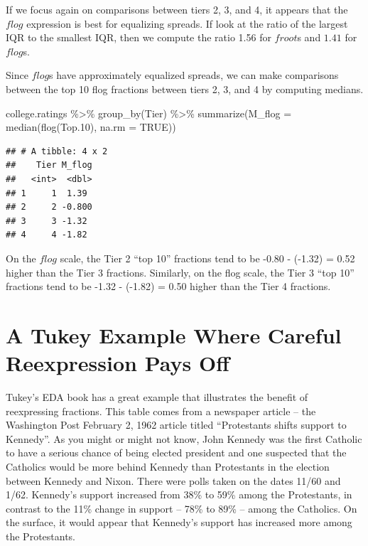 \documentclass[
]{book}
\newenvironment{Shaded}{\begin{snugshade}}{\end{snugshade}}
\newcommand{\AttributeTok}[1]{\textcolor[rgb]{0.77,0.63,0.00}{#1}}
\newcommand{\ConstantTok}[1]{\textcolor[rgb]{0.00,0.00,0.00}{#1}}
\newcommand{\FloatTok}[1]{\textcolor[rgb]{0.00,0.00,0.81}{#1}}
\newcommand{\FunctionTok}[1]{\textcolor[rgb]{0.00,0.00,0.00}{#1}}
\newcommand{\NormalTok}[1]{#1}
\newcommand{\SpecialCharTok}[1]{\textcolor[rgb]{0.00,0.00,0.00}{#1}}
\begin{document}
If we focus again on comparisons between tiers 2, 3, and 4, it appears that the \(flog\) expression is best for equalizing spreads. If look at the ratio of the largest IQR to the smallest IQR, then we compute the ratio 1.56 for \(froot\)s and \(1.41\) for \(flog\)s.

Since \(flog\)s have approximately equalized spreads, we can make comparisons between the top 10 flog fractions between tiers 2, 3, and 4 by computing medians.

\begin{Shaded}
\begin{Highlighting}[]
\NormalTok{college.ratings }\SpecialCharTok{\%\textgreater{}\%} 
  \FunctionTok{group\_by}\NormalTok{(Tier) }\SpecialCharTok{\%\textgreater{}\%} 
  \FunctionTok{summarize}\NormalTok{(}\AttributeTok{M\_flog =} \FunctionTok{median}\NormalTok{(}\FunctionTok{flog}\NormalTok{(Top}\FloatTok{.10}\NormalTok{), }\AttributeTok{na.rm =} \ConstantTok{TRUE}\NormalTok{))}
\end{Highlighting}
\end{Shaded}

\begin{verbatim}
## # A tibble: 4 x 2
##    Tier M_flog
##   <int>  <dbl>
## 1     1  1.39 
## 2     2 -0.800
## 3     3 -1.32 
## 4     4 -1.82
\end{verbatim}

On the \(flog\) scale, the Tier 2 ``top 10'' fractions tend to be -0.80 - (-1.32) = 0.52 higher than the Tier 3 fractions. Similarly, on the flog scale, the Tier 3 ``top 10'' fractions tend to be -1.32 - (-1.82) = 0.50 higher than the Tier 4 fractions.

\hypertarget{a-tukey-example-where-careful-reexpression-pays-off}{%
\section{A Tukey Example Where Careful Reexpression Pays Off}\label{a-tukey-example-where-careful-reexpression-pays-off}}

Tukey's EDA book has a great example that illustrates the benefit of reexpressing fractions. This table comes from a newspaper article -- the Washington Post February 2, 1962 article titled ``Protestants shifts support to Kennedy''. As you might or might not know, John Kennedy was the first Catholic to have a serious chance of being elected president and one suspected that the Catholics would be more behind Kennedy than Protestants in the election between Kennedy and Nixon. There were polls taken on the dates 11/60 and 1/62. Kennedy's support increased from 38\% to 59\% among the Protestants, in contrast to the 11\% change in support -- 78\% to 89\% -- among the Catholics. On the surface, it would appear that Kennedy's support has increased more among the Protestants.
\end{document}
